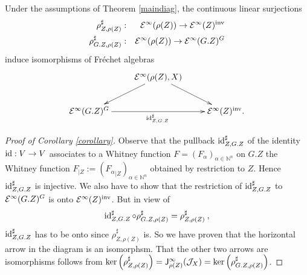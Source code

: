 \begin{corollary} \label{corollary} 
Under the assumptions of Theorem \ref{maindiag}, the continuous linear surjections 
\begin{eqnarray*}
\rho^\sharp_{Z,\rho(Z)}&:&\mathcal{E}^\infty(\rho(Z))\to \mathcal{E}^\infty(Z)^\textup{inv}\\
\rho^\sharp_{G.Z,\rho(Z)}&:&\mathcal{E}^\infty(\rho(Z))\to \mathcal{E}^\infty(G.Z)^G
\end{eqnarray*}
induce isomorphisms of Fr{\'e}chet algebras
\begin{eqnarray*}
\xymatrix{&\calE^\infty(\rho(Z),X)\ar[dl] \ar[dr] &\\
\calE^\infty(G.Z)^G\ar[rr]_{\id^\sharp_{Z,G.Z}}&&\calE^\infty(Z)^\textup{inv}.}
\end{eqnarray*}
\end{corollary}
\begin{proof}[Proof of Corollary \ref{corollary}]
Observe that the pullback $\operatorname{id}^\sharp_{Z,G.Z}$ of the identity $\operatorname{id}:V\to V$ associates to a Whitney function $F=(F_\alpha)_{\alpha\in \mathbb N^n}$ on $G.Z$ the Whitney function  $F_{|Z}:=({F_\alpha}_{|Z})_{\alpha\in \mathbb N^n}$ obtained by restriction to $Z$. Hence $\operatorname{id}^\sharp_{Z,G.Z}$ is injective. We also have  to show that the restriction of $\operatorname{id}^\sharp_{Z,G.Z}$ to $\mathcal{E}^\infty(G.Z)^G$ is onto $\mathcal{E}^\infty(Z)^\textup{inv}$. But in view of  
\begin{eqnarray}\label{idrhorho}
\operatorname{id}^\sharp_{Z,G.Z}\circ\rho^\sharp_{G.Z,\rho(Z)} =\rho^\sharp_{Z,\rho(Z)}\:,
\end{eqnarray}
$\operatorname{id}^\sharp_{Z,G.Z}$ has to be onto since $\rho^\sharp_{Z,\rho(Z)}$ is. So we have proven that the horizontal arrow in the diagram is an isomorphsm. That the other two arrows are isomorphisms follows from  $\operatorname{ker}\left(\rho^\sharp_{Z,\rho(Z)}\right)=\mathsf{J}^\infty_{\rho(Z)}(\mathcal{J}_X)=\operatorname{ker}\left(\rho^\sharp_{G.Z,\rho(Z)}\right)$.
\end{proof}

